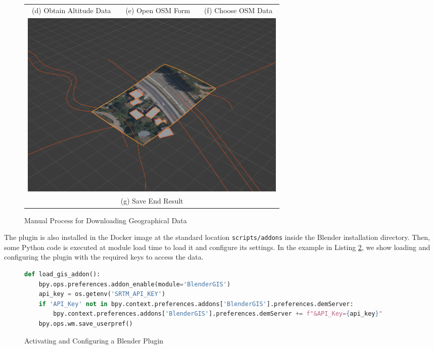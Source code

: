 \begin{figure}[H]
\begin{tabular}{ccc}
  (d) Obtain Altitude Data &   
  (e) Open OSM Form &          
  (f) Choose OSM Data \\
  \multicolumn{3}{c}{ \includegraphics[width=130mm]{src/img/manual-download/7-end-result.jpg} }  \\ 
  \multicolumn{3}{c}{ (g) Save End Result }
 
\end{tabular}
\caption{Manual Process for Downloading Geographical Data}
\label{fig:manual-download-geo}
\end{figure}


The plugin is also installed in the Docker image at the standard location \texttt{scripts/addons} inside the Blender installation directory. Then, some Python code is executed at module load time to load it and configure its settings. In the example in Listing \ref{fig:blender-plugin}, we show loading and configuring the plugin with the required keys to access the data.

\begin{figure}[H]
\begin{lstlisting}[language=python]
def load_gis_addon():                                   
    bpy.ops.preferences.addon_enable(module='BlenderGIS')
    api_key = os.getenv('SRTM_API_KEY')
    if 'API_Key' not in bpy.context.preferences.addons['BlenderGIS'].preferences.demServer:
        bpy.context.preferences.addons['BlenderGIS'].preferences.demServer += f"&API_Key={api_key}"
    bpy.ops.wm.save_userpref() 
\end{lstlisting}
\caption{Activating and Configuring a Blender Plugin}
\label{fig:blender-plugin}
\end{figure}


